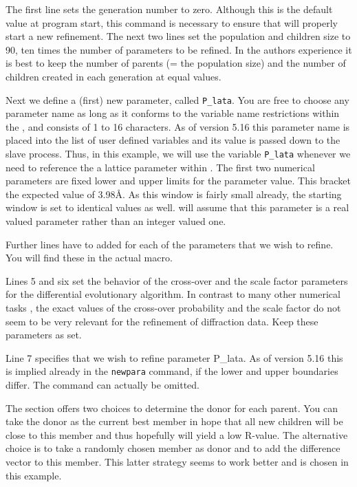 The first line sets the generation number to zero. Although this is the default
value at program start, this command is necessary to ensure that \Discus will 
properly start a new refinement. The next two lines set the population and 
children size to 90, ten times the number of parameters to be refined. In the
authors experience it is best to keep the number of parents (= the population
size) and the number of children created in each generation at equal values.

Next we define a (first) new parameter, called {\tt P\_lata}. You are free to 
choose any parameter name as long as it conforms to the variable name restrictions
within the \suite, and consists of 1 to 16 characters. As of version 5.16 this
parameter name is placed into the list of user defined variables and its value 
is passed down to the slave process. Thus, in this example, we will use the
variable {\tt P\_lata} whenever we need to reference the a lattice parameter 
within \discus. The first two numerical parameters are fixed lower and upper
limits for the parameter value. This bracket the expected value of 3.98\AA.
As this window is fairly small already, the starting window is set to identical
values as well. \Discus will assume that this parameter is a real valued 
parameter rather than an integer valued one. 

Further lines have to added for each of the parameters that we wish to refine.
You will find these in the actual macro.

Lines 5 and six set the behavior of the cross-over and the scale factor 
parameters for the differential evolutionary algorithm. In contrast to many
other numerical tasks \cite{prstla2005}, the exact values of the cross-over
probability and the scale factor do not seem to be very relevant for the 
refinement of diffraction data. Keep these parameters as set.

Line 7 specifies that we wish to refine parameter P\_lata. As of version 5.16
this is implied already in the {\tt newpara} command, if the lower and upper 
boundaries differ. The command can actually be omitted.

The \Diffev section offers two choices to determine the donor for each parent.
You can take the donor as the current best member in hope that all new children
will be close to this member and thus hopefully will yield a low R-value. The
alternative choice is to take a randomly chosen member as donor and to add the
difference vector to this member. This latter strategy seems to work better and
is chosen in this example.

